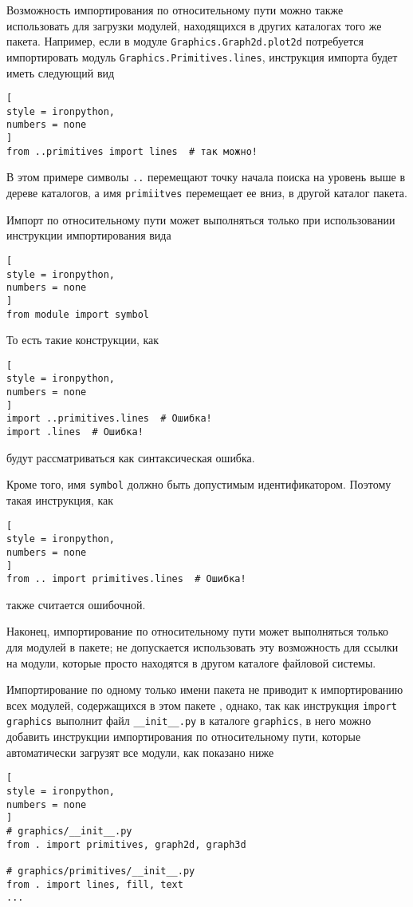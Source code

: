 \documentclass[%
	11pt,
	a4paper,
	utf8,
		]{article}
\begin{document}
Возможность импортирования по относительному пути можно также использовать для загрузки модулей, находящихся в других каталогах того же пакета. Например, если в модуле \texttt{Graphics.Graph2d.plot2d} потребуется импортировать модуль \texttt{Graphics.Primitives.lines}, инструкция импорта будет иметь следующий вид
\begin{lstlisting}[
style = ironpython,
numbers = none
]
from ..primitives import lines  # так можно!
\end{lstlisting}

В этом примере символы \texttt{..} перемещают точку начала поиска на уровень выше в дереве каталогов, а имя \texttt{primiitves} перемещает ее вниз, в другой каталог пакета.

Импорт по относительному пути может выполняться только при использовании инструкции импортирования вида
\begin{lstlisting}[
style = ironpython,
numbers = none
]
from module import symbol
\end{lstlisting}

То есть такие конструкции, как
\begin{lstlisting}[
style = ironpython,
numbers = none
]
import ..primitives.lines  # Ошибка!
import .lines  # Ошибка!
\end{lstlisting}
будут рассматриваться как синтаксическая ошибка.

Кроме того, имя \texttt{symbol} должно быть допустимым идентификатором. Поэтому такая инструкция, как 
\begin{lstlisting}[
style = ironpython,
numbers = none
]
from .. import primitives.lines  # Ошибка!
\end{lstlisting}
также считается ошибочной.

Наконец, импортирование по относительному пути может выполняться только для модулей в пакете; не допускается использовать эту возможность для ссылки на модули, которые просто находятся в другом каталоге файловой системы.

Импортирование по одному только имени пакета не приводит к импортированию всех модулей, содержащихся в этом пакете \cite[]{beazley:python-2010}, однако, так как инструкция \texttt{import graphics} выполнит файл \verb|__init__.py| в каталоге \texttt{graphics}, в него можно добавить инструкции импортирования по относительному пути, которые автоматически загрузят все модули, как показано ниже
\begin{lstlisting}[
style = ironpython,
numbers = none
]
# graphics/__init__.py
from . import primitives, graph2d, graph3d

# graphics/primitives/__init__.py
from . import lines, fill, text
...
\end{lstlisting}
\end{document}
